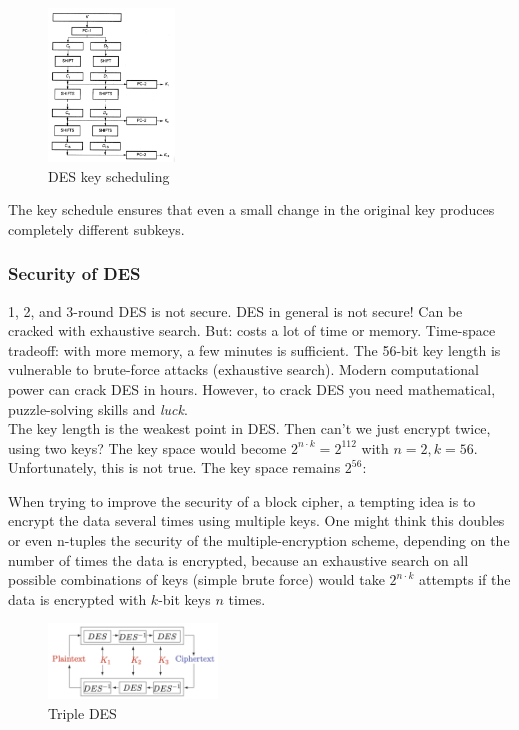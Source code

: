 \begin{figure}[h!]
    \centering
    \includegraphics[width=0.3\textwidth]{img/DESkey.png}
    \caption{DES key scheduling}
    \label{fig:key}
\end{figure}

The key schedule ensures that even a small change in the original key produces completely different subkeys.




\subsubsection{Security of DES}
1, 2, and 3-round DES is not secure. DES in general is not secure! Can be cracked with exhaustive search. But: costs a lot of time or memory. Time-space tradeoff: with more memory, a few minutes is sufficient. The 56-bit key length is vulnerable to brute-force attacks (exhaustive search). Modern computational power can crack DES in hours. 
However, to crack DES you need mathematical, puzzle-solving skills and \emph{luck}. \\

The key length is the weakest point in DES. Then can't we just encrypt twice, using two keys? The key space would become $2^{n\cdot k} = 2^{112}$ with $n = 2, k = 56$. Unfortunately, this is not true. The key space remains $2^{56}$:

When trying to improve the security of a block cipher, a tempting idea is to encrypt the data several times using multiple keys. One might think this doubles or even n-tuples the security of the multiple-encryption scheme, depending on the number of times the data is encrypted, because an exhaustive search on all possible combinations of keys (simple brute force) would take $2^{n\cdot k}$ attempts if the data is encrypted with $k$-bit keys $n$ times. \\

\begin{figure}[h!]
\centering
\includegraphics[width=0.4\textwidth]{img/3DES.png}
\caption{Triple DES}
\end{figure}

